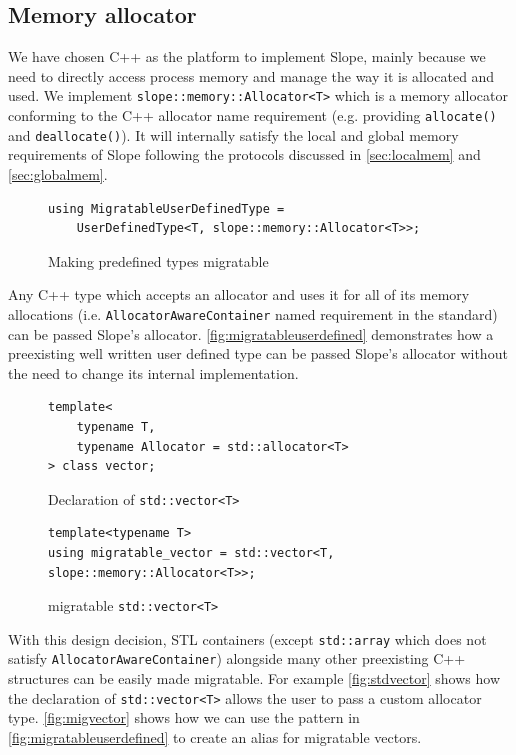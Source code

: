 \subsection{Memory allocator}
\label{sec:platform}
We have chosen C++ as the platform to implement Slope, mainly because we need
to directly access process memory and manage the way it is allocated and used.
We implement \texttt{slope::memory::Allocator<T>} which is a memory allocator
conforming to the C++ allocator name requirement (e.g. providing
\texttt{allocate()} and \texttt{deallocate()}). It will internally satisfy the
local and global memory requirements of Slope following the protocols discussed
in \autoref{sec:localmem} and \autoref{sec:globalmem}.

\begin{figure}[t]
\begin{lstlisting}
using MigratableUserDefinedType =
    UserDefinedType<T, slope::memory::Allocator<T>>;
\end{lstlisting}
\caption{
    Making predefined types migratable
}
\label{fig:migratableuserdefined}
\end{figure}

Any C++ type which accepts an allocator and uses it for all of its memory
allocations (i.e. \texttt{AllocatorAwareContainer} named requirement in the standard)
can be passed Slope's allocator. \autoref{fig:migratableuserdefined}
demonstrates how a preexisting well written user defined type can be
passed Slope's allocator without the need to change its internal implementation.

\begin{figure}[t]
\begin{lstlisting}
template<
    typename T,
    typename Allocator = std::allocator<T>
> class vector;
\end{lstlisting}
\caption{
    Declaration of \texttt{std::vector<T>}
}
\label{fig:stdvector}
\end{figure}


\begin{figure}[t]
\begin{lstlisting}
template<typename T>
using migratable_vector = std::vector<T, slope::memory::Allocator<T>>;

\end{lstlisting}
\caption{
    migratable \texttt{std::vector<T>}
}
\label{fig:migvector}
\end{figure}


With this design decision, STL containers (except \texttt{std::array} which
does not satisfy \texttt{AllocatorAwareContainer}) alongside many other preexisting
C++ structures can be easily made migratable.
For example \autoref{fig:stdvector} shows how the declaration of
\texttt{std::vector<T>}
allows the user to pass a custom allocator type. \autoref{fig:migvector} shows
how we can use the pattern in \autoref{fig:migratableuserdefined} to create
an alias for migratable vectors.




